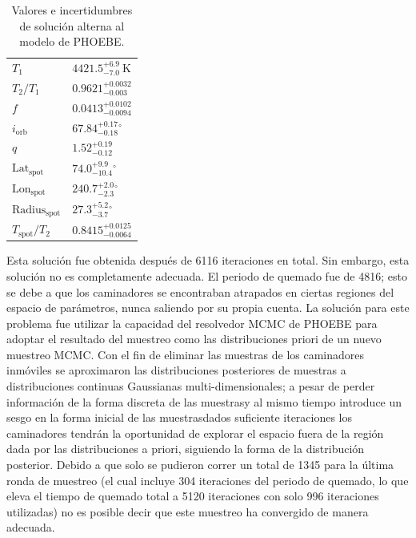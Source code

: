{\renewcommand{\arraystretch}{1.5}%
\begin{table}[!ht]
	\centering
	\begin{tabular}{|P{3cm}|P{4cm}|}
		\hline
		                        &  \\
		\hline
        $T_{1}$ & $4421.5^{ +6.9 }_{ -7.0 } ~\mathrm{K}$ \\
        \hline
        $T_2 / T_1$ & $0.9621^{ +0.0032 }_{ -0.003 } \mathrm{}$ \\
        \hline
        $f$ & $0.0413^{ +0.0102 }_{ -0.0094 } \mathrm{}$ \\
        \hline
        $i_{\mathrm{orb}}$ & $67.84^{ +0.17 }_{ -0.18 } \mathrm{{}^{\circ}}$ \\
        \hline
        $q$ & $1.52^{ +0.19 }_{ -0.12 } \mathrm{}$ \\
        \hline
        $\mathrm{ Lat }_{\mathrm{spot}}$ & $74.0^{ +9.9 }_{ -10.4 } \mathrm{{}^{\circ}}$ \\
        \hline
        $\mathrm{ Lon }_{\mathrm{spot}}$ & $240.7^{ +2.0 }_{ -2.3 } \mathrm{{}^{\circ}}$ \\
        \hline
        $\mathrm{ Radius }_{\mathrm{spot}}$ & $27.3^{ +5.2 }_{ -3.7 } \mathrm{{}^{\circ}}$ \\
        \hline
        $T_{\mathrm{spot}} / T_2$ & $0.8415^{ +0.0125 }_{ -0.0064 } \mathrm{}$ \\
        \hline
	\end{tabular}
	\caption{Valores e incertidumbres de solución alterna al modelo de PHOEBE.}
	\label{tablaMcmcResultadosIncertidumbresAlt}
\end{table}}

Esta solución fue obtenida después de 6116 iteraciones en total. Sin embargo,
esta solución no es completamente adecuada. El periodo de quemado fue de 4816;
esto se debe a que los caminadores se encontraban atrapados en ciertas regiones
del espacio de parámetros, nunca saliendo por su propia cuenta. La solución para
este problema fue utilizar la capacidad del resolvedor MCMC de PHOEBE para
adoptar el resultado del muestreo como las distribuciones priori de un nuevo
muestreo MCMC. Con el fin de eliminar las muestras de los caminadores inmóviles
se aproximaron las distribuciones posteriores de muestras a distribuciones
continuas Gaussianas multi-dimensionales; a pesar de perder información de la
forma discreta de las muestras\textemdash y al mismo tiempo introduce un sesgo
en la forma inicial de las muestras\textemdash dados suficiente iteraciones los
caminadores tendrán la oportunidad de explorar el espacio fuera de la región
dada por las distribuciones a priori, siguiendo la forma de la distribución
posterior. Debido a que solo se pudieron correr un total de 1345 para la última
ronda de muestreo (el cual incluye 304 iteraciones del periodo de quemado, lo
que eleva el tiempo de quemado total a 5120 iteraciones con solo 996 iteraciones
utilizadas) no es posible decir que este muestreo ha convergido de manera
adecuada.

